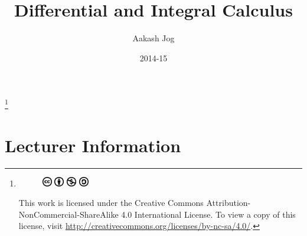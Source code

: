 \documentclass[fleqn, a4paper, 12pt, twoside]{article}
\title{Differential and Integral Calculus}
\author{Aakash Jog}
\date{2014-15}
\theoremstyle{definition}
\theoremstyle{theorem}
\newcommand\blfootnote[1]{%
	\begingroup
	\renewcommand\thefootnote{}\footnote{#1}%
	\addtocounter{footnote}{-1}%
	\endgroup
}
\begin{document}
\maketitle

\blfootnote
{	
	\begin{figure}[H]
		\includegraphics[height = 12pt]{cc.eps}
		\includegraphics[height = 12pt]{by.eps}
		\includegraphics[height = 12pt]{nc.eps}
		\includegraphics[height = 12pt]{sa.eps}
	\end{figure}
	This work is licensed under the Creative Commons Attribution-NonCommercial-ShareAlike 4.0 International License. To view a copy of this license, visit \url{http://creativecommons.org/licenses/by-nc-sa/4.0/}.
} %

\tableofcontents

\newpage
\section{Lecturer Information}
\end{document}

